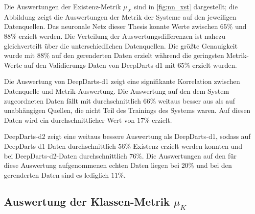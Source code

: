 Die Auswertungen der Existenz-Metrik $\mu_X$ sind in \autoref{fig:nn_xst} dargestellt; die Abbildung zeigt die Auswertungen der Metrik der Systeme auf den jeweiligen Datenquellen. Das neuronale Netz dieser Thesis konnte Werte zwischen $65\%$ und $88\%$ erzielt werden. Die Verteilung der Auswertungsdifferenzen ist nahezu gleichverteilt über die unterschiedlichen Datenquellen. Die größte Genauigkeit wurde mit $88\%$ auf den gerenderten Daten erzielt während die geringsten Metrik-Werte auf den Validierungs-Daten von DeepDarts-d1 mit $65\%$ erzielt wurden.

Die Auswertung von DeepDarts-d1 zeigt eine signifikante Korrelation zwischen Datenquelle und Metrik-Auswertung. Die Auswertung auf den dem System zugeordneten Daten fällt mit durchschnittlich $66\%$ weitaus besser aus als auf unabhängigen Quellen, die nicht Teil des Trainings des Systems waren. Auf diesen Daten wird ein durchschnittlicher Wert von $17\%$ erzielt.

DeepDarts-d2 zeigt eine weitaus bessere Auswertung als DeepDarts-d1, sodass auf DeepDarts-d1-Daten durchschnittlich $56\%$ Existenz erzielt werden konnten und bei DeepDarts-d2-Daten durchschnittlich $76\%$. Die Auswertungen auf den für diese Auswertung aufgenommenen echten Daten liegen bei $20\%$ und bei den gerenderten Daten sind es lediglich $11\%$.


\subsection{Auswertung der Klassen-Metrik \texorpdfstring{$\mu_K$}{µ\_K}}
\label{sec:auswertung_cls}

\NNCls

